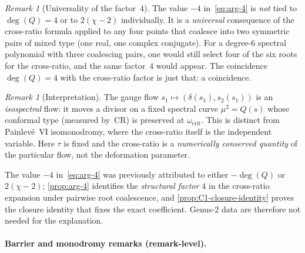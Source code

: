 \documentclass[11pt,a4paper]{article}
\theoremstyle{plain}
\theoremstyle{definition}
\theoremstyle{remark}
\newtheorem{remark}[theorem]{Remark}
\begin{document}
\begin{remark}[Universality of the factor~$4$]
The value $-4$ in~\eqref{eq:arg-4} is
\emph{not} tied to $\deg(Q) = 4$ or to $2(\chi - 2)$
individually.  It is a \emph{universal} consequence of the
cross-ratio formula applied to any four points that coalesce
into two symmetric pairs of mixed type (one real, one complex
conjugate).  For a degree-$6$ spectral polynomial with three
coalescing pairs, one would still select four of the six roots
for the cross-ratio, and the same factor~$4$ would appear.
The coincidence $\deg(Q) = 4$ with the cross-ratio factor is just
that: a coincidence.
\end{remark}

\begin{remark}[Interpretation]
\label{rem:isospectral}
The gauge flow $s_1 \mapsto (\delta(s_1), s_2(s_1))$ is an
\emph{isospectral} flow: it moves a divisor on a fixed spectral
curve $\mu^2 = Q(s)$ whose conformal type (measured by~$\mathrm{CR}$)
is preserved at $\omega_{\mathrm{crit}}$.
This is distinct from Painlev\'e~VI isomonodromy, where the
cross-ratio itself is the independent variable.  Here $\tau$ is
fixed and the cross-ratio is a \emph{numerically conserved quantity} of the
particular flow, not the deformation parameter.

The value $-4$ in~\eqref{eq:arg-4} was previously attributed to
either $-\deg(Q)$ or $2(\chi - 2)$;
\cref{prop:arg-4} identifies the \emph{structural factor $4$} in the
cross-ratio expansion under pairwise root coalescence, and
\cref{prop:C1-closure-identity} proves the closure identity that fixes
the exact coefficient.  Genus-$2$ data are therefore not needed
for the explanation.
\end{remark}

\paragraph{Barrier and monodromy remarks (remark-level).}
\end{document}
